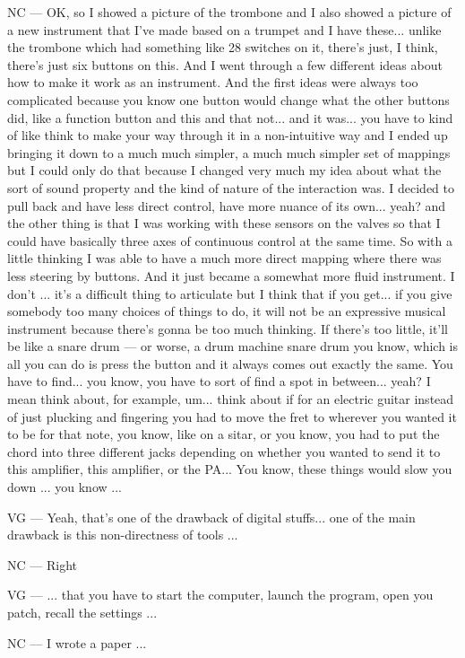 NC — OK, so I showed a picture of the trombone and I also showed a picture of a new instrument that I've made based on a trumpet and I have these... unlike the trombone which had something like 28 switches on it, there's just, I think, there's just six buttons on this. And I went through a few different ideas about how to make it work as an instrument. And the first ideas were always too complicated because you know one button would change what the other buttons did, like a function button and this and that not... and it was... you have to kind of like think to make your way through it in a non-intuitive way and I ended up bringing it down to a much much simpler, a much much simpler set of mappings but I could only do that because I changed very much my idea about what the sort of sound property and the kind of nature of the interaction was. I decided to pull back and have less direct control, have more nuance of its own... yeah? and the other thing is that I was working with these sensors on the valves so that I could have basically three axes of continuous control at the same time. So with a little thinking I was able to have a much more direct mapping where there was less steering by buttons. And it just became a somewhat more fluid instrument. I don't ... it's a difficult thing to articulate but I think that if you get... if you give somebody too many choices of things to do, it will not be an expressive musical instrument because there's gonna be too much thinking. If there's too little, it'll be like a snare drum — or worse, a drum machine snare drum you know, which is all you can do is press the button and it always comes out exactly the same. You have to find... you know, you have to sort of find a spot in between... yeah? I mean think about,  for example, um...  think about if for an electric guitar instead of just plucking and fingering you had to move the fret to wherever you wanted it to be for that note, you know, like on a sitar, or you know, you had to put the chord into three different jacks depending on whether you wanted to send it to this amplifier, this amplifier, or the PA... You know, these things would  slow you down ... you know ... 

VG — Yeah, that's one of the drawback of digital stuffs...  one of the main drawback is this non-directness of tools ...

NC — Right 

VG — ... that you have to start the computer, launch the program, open you patch, recall the settings ...

NC — I wrote a paper ... 

